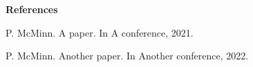 {\bf References}

\cite{McMinn2021} P. McMinn. A paper. In A conference, 2021.

\cite{McMinn2022} P. McMinn. Another paper. In Another conference, 2022.

